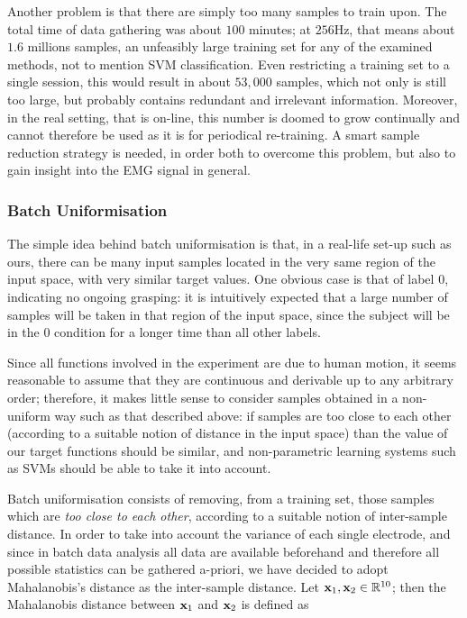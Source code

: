 Another problem is that there are simply too many samples to train
upon. The total time of data gathering was about $100$ minutes; at
$256$Hz, that means about $1.6$ millions samples, an unfeasibly large
training set for any of the examined methods, not to mention SVM
classification. Even restricting a training set to a single session,
this would result in about $53,000$ samples, which not only is still
too large, but probably contains redundant and irrelevant information.
Moreover, in the real setting, that is on-line, this number is doomed
to grow continually and cannot therefore be used as it is for
periodical re-training. A smart sample reduction strategy is needed,
in order both to overcome this problem, but also to gain insight into
the EMG signal in general.

\subsubsection{Batch Uniformisation}

The simple idea behind batch uniformisation is that, in a real-life
set-up such as ours, there can be many input samples located in the
very same region of the input space, with very similar target
values. One obvious case is that of label $0$, indicating no ongoing
grasping: it is intuitively expected that a large number of samples
will be taken in that region of the input space, since the subject
will be in the $0$ condition for a longer time than all other
labels. 

Since all functions involved in the experiment are due to human
motion, it seems reasonable to assume that they are continuous and
derivable up to any arbitrary order; therefore, it makes little sense
to consider samples obtained in a non-uniform way such as that
described above: if samples are too close to each other (according to
a suitable notion of distance in the input space) than the value of
our target functions should be similar, and non-parametric learning
systems such as SVMs should be able to take it into account.

Batch uniformisation consists of removing, from a training set, those
samples which are \emph{too close to each other}, according to a
suitable notion of inter-sample distance. In order to take into
account the variance of each single electrode, and since in batch data
analysis all data are available beforehand and therefore all possible
statistics can be gathered a-priori, we have decided to adopt
Mahalanobis's distance as the inter-sample distance. Let $\mathbf{x}_1, \mathbf{x}_2
\in \mathbb{R}^{10}$; then the Mahalanobis distance between $\mathbf{x}_1$ and
$\mathbf{x}_2$ is defined as

